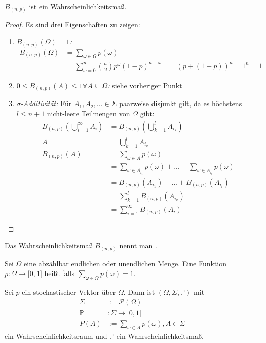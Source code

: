 \begin{theorem}
$B_{(n,p)}$ ist ein Wahrscheinlichkeitsmaß.
\end{theorem}
\begin{proof} Es sind drei Eigenschaften zu zeigen:
\newline
\begin{enumerate}
	\item\emph{$B_{(n,p)}(\Omega) = 1$:}
\begin{align*}
B_{(n,p)}(\Omega) &= \sum\limits_{\omega \in \Omega}p(\omega) \\
	&= \sum\limits_{\omega =0}^n \binom{n}{\omega}p^\omega(1-p)^{n-\omega}
	&= (p + (1 - p))^n = 1^n = 1
\end{align*}
	\item\emph{$0 \leq B_{(n,p)}(A) \leq 1 \forall A \subseteq \Omega$:}
siehe vorheriger Punkt
	\item\emph{$\sigma$-Additivität:}
Für $A_1,A_2, ... \in \Sigma $ paarweise disjunkt gilt, da es höchstens $l \leq n+1$ nicht-leere Teilmengen von $\Omega$ %
gibt:
\begin{align*}
B_{(n,p)}\left (\bigcup\limits_{i=1}^\infty A_i \right) &= B_{(n,p)}\left (\bigcup\limits_{k=1}^{l} A_{i_k} \right) \\
A &= \bigcup\limits_{k=1}^{l} A_{i_k} \\
B_{(n,p)}(A) &= \sum\limits_{\omega \in A} p(\omega) \\
	&= \sum\limits_{\omega \in A_{i_1}} p(\omega) +  ... + \sum\limits_{\omega \in A_{i_l}} p(\omega) \\
	&= B_{(n,p)}(A_{i_1}) + ... + B_{(n,p)}(A_{i_l}) \\
	&= \sum\limits_{k=1}^{l} B_{(n,p)}(A_{i_k}) \\
	&= \sum\limits_{i=1}^{\infty} B_{(n,p)}(A_{i})
\end{align*}
\end{enumerate}
\end{proof}
Das Wahrscheinlichkeitsmaß $B_{(n,p)}$ nennt man .
\begin{definition}
Sei $\Omega$ eine abzählbar endlichen oder unendlichen Menge. Eine Funktion $p:\Omega \rightarrow \lbrack 0,1 \rbrack$ heißt %
 falls $\sum\limits_{\omega \in \Omega} p(\omega) = 1$.
\end{definition}
\begin{theorem}\label{theorem:EndlicherWahrscheinlichkeitsraum}
Sei $p$ ein stochastischer Vektor über $\Omega$. Dann ist $(\Omega, \Sigma, \mathbb P)$ mit
\begin{align*}
\Sigma &:= \mathcal P(\Omega) \\
\mathbb P&: \Sigma \rightarrow \lbrack 0,1 \rbrack \\
P(A) &:= \sum\limits_{\omega \in A} p(\omega) , A \in \Sigma
\end{align*}
ein Wahrscheinlichkeitsraum und $\mathbb P$ ein Wahrscheinlichkeitsmaß.
\end{theorem}
